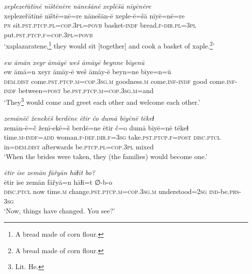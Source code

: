 \ea \label{RE.24}
\textit{xeplezeřātīnē nīštēnēre nānešānē xeplēšā nīyēnēre} \\ 
\gll xeplezeřātīnē nīštē=nē=re nānešān-ē xeple-ē=šā nīyē=nē=re \\ 
 \textsc{pn} sit\textsc{.pst}\textsc{.ptcp}\textsc{.pl}\textsc{=cop}\textsc{.3pl}\textsc{=\textsc{povb}} basket\textsc{-indf} bread\textsc{.f}\textsc{-dir}\textsc{.pl}\textsc{=3pl} put\textsc{.pst}\textsc{.ptcp}\textsc{.f}\textsc{=cop}\textsc{.3pl}\textsc{=\textsc{povb}} \\ 
\glt `xaplazaratene,\footnote{A bread made of corn flour.} they would sit [together] and cook a basket of xaple.\footnote{A bread made of corn flour.}'
\z 
 
\ea \label{RE.25}
\textit{ew āmān xeyr āmāyē weš āmāyē beynne bīyenū} \\ 
\gll ew āmā=n xeyr āmāy-ē weš āmāy-ē beyn=ne bīye=n=ū \\ 
 \textsc{dem.dist} come\textsc{.pst}\textsc{.ptcp}\textsc{.m}\textsc{=cop}\textsc{.3sg}\textsc{.m} goodness\textsc{.m} come\textsc{.inf}\textsc{-indf} good come\textsc{.inf}\textsc{-indf} between\textsc{=\textsc{post}} be\textsc{.pst}\textsc{.ptcp}\textsc{.m}\textsc{=cop}\textsc{.3sg}\textsc{.m}=and \\ 
\glt `They\footnote{Lit. He.} would come and greet each other and welcome each other.'
\z 
 
\ea \label{RE.26}
\textit{zemānēč ženekēš berdēne ētir čo dumā bīyēnē tēkeɫ} \\ 
\gll zemān-ē=č ženī-ekē=š berdē=ne ētir č=o dumā bīyē=nē tēkeɫ \\ 
 time\textsc{.m}\textsc{-indf}\textsc{=add} woman\textsc{.f}\textsc{-def}\textsc{.dir}\textsc{.f}\textsc{=3sg} take\textsc{.pst}\textsc{.ptcp}\textsc{.f}\textsc{=\textsc{post}} \textsc{disc.ptcl} in=\textsc{dem.dist} afterwards be\textsc{.ptcp}\textsc{.pl}\textsc{=cop}\textsc{.3pl} mixed \\ 
\glt `When the brides were taken, they (the families) would become one.'
\z 
 
\ea \label{RE.27}
\textit{ētir īse zemān fāřyān hāɫīt bo?} \\ 
\gll ētir īse zemān fāřyā=n hāɫī=t ∅-b-o \\ 
 \textsc{disc.ptcl} now time\textsc{.m} change\textsc{.pst}\textsc{.ptcp}\textsc{.m}\textsc{=cop}\textsc{.3sg}\textsc{.m} understood\textsc{=\textsc{2sg}} \textsc{ind-}be\textsc{.prs}\textsc{-3sg} \\ 
\glt `Now, things have changed. You see?'
\z 
 

